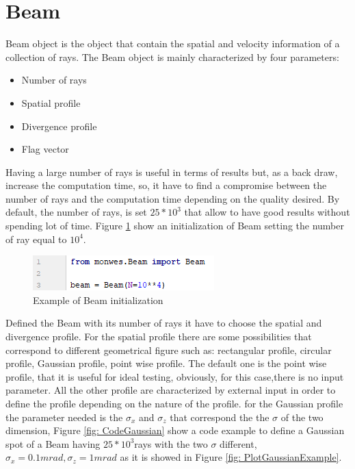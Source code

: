 \section{Beam}
Beam object is the object that contain the spatial and velocity information of a collection of rays. The Beam object is mainly characterized by four parameters: 
\begin{itemize}
\item Number of rays
\item Spatial profile
\item Divergence profile
\item Flag vector
\end{itemize}
Having a large number of rays is useful in terms of results but, as a back draw, increase the computation time, so, it have to find a compromise between the number of rays and the computation time depending on the quality desired. By default, the number of rays, is set $25*10^3 $ that allow to have good results without spending lot of time. Figure \ref{fig: BeamRays} show an initialization of Beam setting the number of ray equal to $10^4 $.
\begin{figure}[H]
%
\centering
%
\includegraphics[width=.4\textwidth]{Immagini/Chapter3/BeamRays}
%
\caption{Example of Beam initialization}
%
\label{fig: BeamRays}
%
\end{figure}
Defined the Beam with its number of rays it have to choose the spatial and divergence profile. For the spatial profile there are some possibilities that correspond to different geometrical figure such as: rectangular profile, circular profile, Gaussian profile, point wise profile. The default one is the point wise profile, that it is useful for ideal testing, obviously, for this case,there is no input parameter. All the other profile are characterized by external input in order to define the profile depending on the nature of the profile. for the Gaussian profile the parameter needed is the $\sigma_x $ and  
$\sigma_z $ that correspond the the $\sigma $ of the two dimension, Figure \ref{fig: CodeGaussian} show a code example to define a Gaussian spot of a Beam having $25*10^3 $rays with the two $\sigma $ different, $\sigma_x = 0.1mrad, \sigma_z = 1mrad $ as it is showed in Figure \ref{fig: PlotGaussianExample}.
%
